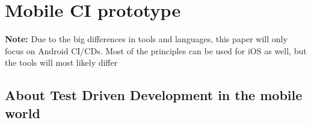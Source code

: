 \section{Mobile CI prototype}

\begin{mdframed}[style=InfoBox,align=center]
	\textbf{Note:} Due to the big differences in tools and languages, this paper will only focus on Android CI/CDs. Most of the principles can be used for iOS as well, but the tools will most likely differ
\end{mdframed}

\subsection{About Test Driven Development in the mobile world}